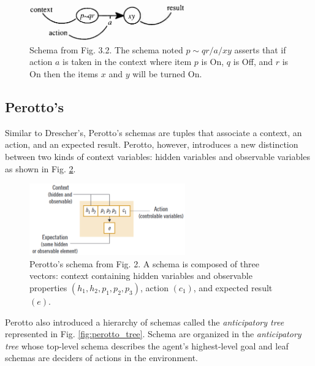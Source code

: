\documentclass[runningheads]{llncs}
\begin{document}
\begin{figure}
	\centering
	\includegraphics[width=0.6\textwidth]{Figure_2_schema_drescher.png}
	\caption{Schema from \cite{drescher_made-up_1991} Fig. 3.2.
	The schema noted $p \!\sim\! qr/a/xy$ asserts that if action $a$ is taken in the context where item $p$ is On, $q$ is Off, and $r$ is On then the items $x$ and $y$ will be turned On.} 
	\label{fig:drescher}
\end{figure}

\cite{drescher_made-up_1991}
\cite{chaput_constructivist_2004}
\cite{guerin_piagetian_2008}
\cite{wang_new_2012}
\cite{miller_building_2018}

\subsection{Perotto's}

Similar to Drescher's, Perotto's schemas \cite{perotto_computational_nodate} are tuples that associate a context, an action, and an expected result. 
Perotto, however, introduces a new distinction between two kinds of context variables: hidden variables and observable variables as shown in  Fig. \ref{fig:perotto}.

\begin{figure}
	\centering
	\includegraphics[width=0.6\textwidth]{Figure_perotto.png}
	\caption{Perotto's schema from \cite{perotto_computational_nodate} Fig. 2.
		A schema is composed of three vectors: context containing hidden variables and observable properties $(h_1, h_2, p_1, p_2, p_3)$, action $(c_1)$, and expected result $(e)$. } 
	\label{fig:perotto}
\end{figure}

Perotto also introduced a hierarchy of schemas called the \textit{anticipatory tree} represented in Fig. \ref{fig:perotto_tree}. 
Schema are organized in the \textit{anticipatory tree} whose top-level schema describes the agent's highest-level goal and leaf schemas are deciders of actions in the environment.
\end{document}
